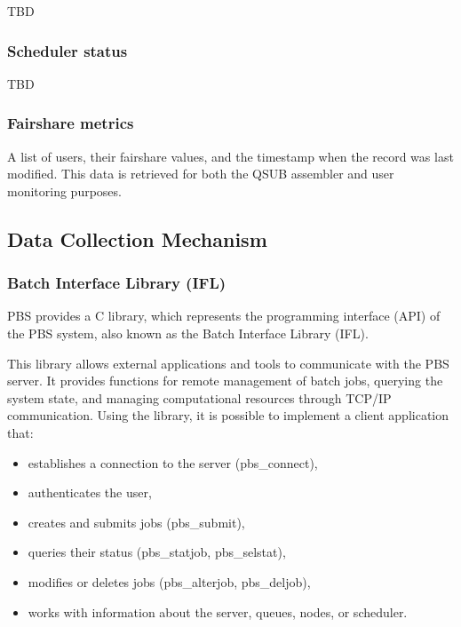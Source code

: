 \documentclass[
  digital,     %
  oneside,     %
  nosansbold,  %
  nocolorbold, %
  lof,         %
  lot,         %
]{fithesis4}
\begin{document}
TBD

\subsubsection{Scheduler status}
\label{subsubsec:scheduler-status}

TBD

\subsubsection{Fairshare metrics}
\label{subsubsec:fairshare-metrics}

A list of users, their fairshare values, and the timestamp when the record was last modified.
This data is retrieved for both the QSUB assembler and user monitoring purposes.

\newpage
\subsection{Data Collection Mechanism}
\label{subsec:data-collection-mechanism}

\subsubsection{Batch Interface Library (IFL)}
\label{subsubsec:batch-interface-library}
PBS provides a C library, which represents the programming interface (API) of the PBS system, also known as the Batch Interface Library (IFL). \cite{pbs2022} 

This library allows external applications and tools to communicate with the PBS server. It provides functions for remote management of batch jobs, querying the system state, and managing computational resources through TCP/IP communication. Using the library, it is possible to implement a client application that: \cite{pbs2022} 

\begin{itemize}
  \item establishes a connection to the server (pbs\_connect),

  \item authenticates the user,
  
  \item creates and submits jobs (pbs\_submit),

  \item queries their status (pbs\_statjob, pbs\_selstat),
   
  \item modifies or deletes jobs (pbs\_alterjob, pbs\_deljob),
  
  \item works with information about the server, queues, nodes, or scheduler.\cite{pbs2022}
\end{itemize}   
\end{document}
